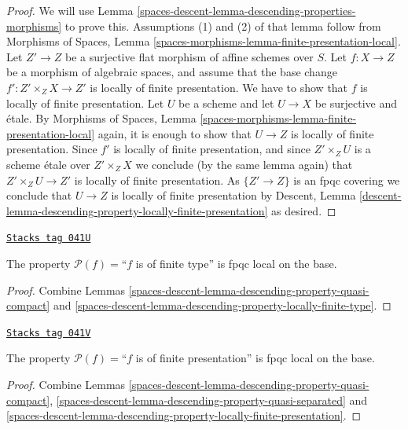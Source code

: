 \begin{proof}
We will use
Lemma \ref{spaces-descent-lemma-descending-properties-morphisms}
to prove this. Assumptions (1) and (2) of that lemma follow from
Morphisms of Spaces,
Lemma \ref{spaces-morphisms-lemma-finite-presentation-local}.
Let $Z' \to Z$ be a surjective flat morphism of affine schemes over $S$.
Let $f : X \to Z$ be a morphism of algebraic spaces, and assume
that the base change $f' : Z' \times_Z X \to Z'$ is locally of
finite presentation.
We have to show that $f$ is locally of finite presentation. Let $U$ be a scheme
and let $U \to X$ be surjective and \'etale. By
Morphisms of Spaces,
Lemma \ref{spaces-morphisms-lemma-finite-presentation-local}
again, it is enough to show that $U \to Z$ is locally of finite presentation.
Since $f'$ is locally of finite presentation, and since $Z' \times_Z U$ is a
scheme \'etale over $Z' \times_Z X$ we conclude (by the same lemma again) that
$Z' \times_Z U \to Z'$ is locally of finite presentation.
As $\{Z' \to Z\}$ is an fpqc covering we conclude that
$U \to Z$ is locally of finite presentation by
Descent,
Lemma \ref{descent-lemma-descending-property-locally-finite-presentation}
as desired.
\end{proof}

\begin{lemma}
\label{spaces-descent-lemma-descending-property-finite-type}
\href{https://stacks.math.columbia.edu/tag/041U}{\texttt{Stacks tag 041U}}

The property $\mathcal{P}(f) =$``$f$ is of finite type''
is fpqc local on the base.
\end{lemma}

\begin{proof}
Combine Lemmas \ref{spaces-descent-lemma-descending-property-quasi-compact}
and \ref{spaces-descent-lemma-descending-property-locally-finite-type}.
\end{proof}

\begin{lemma}
\label{spaces-descent-lemma-descending-property-finite-presentation}
\href{https://stacks.math.columbia.edu/tag/041V}{\texttt{Stacks tag 041V}}

The property $\mathcal{P}(f) =$``$f$ is of finite presentation''
is fpqc local on the base.
\end{lemma}

\begin{proof}
Combine Lemmas \ref{spaces-descent-lemma-descending-property-quasi-compact},
\ref{spaces-descent-lemma-descending-property-quasi-separated} and
\ref{spaces-descent-lemma-descending-property-locally-finite-presentation}.
\end{proof}

